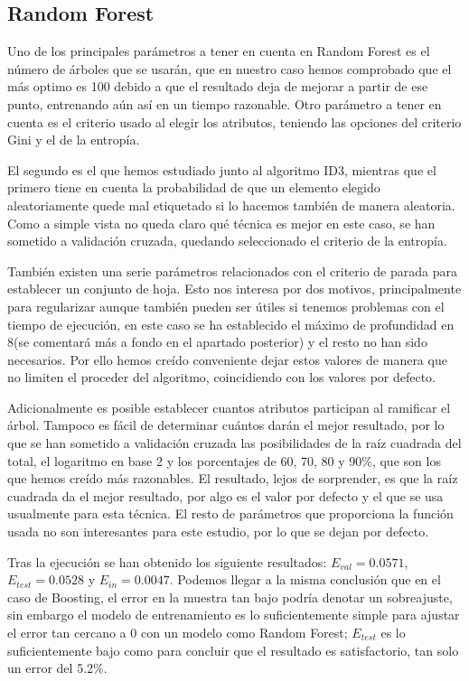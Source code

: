 \documentclass{article}
\begin{document}
	\subsection{Random Forest}
	Uno de los principales parámetros a tener en cuenta en Random Forest es el número de árboles que se usarán, que en nuestro caso hemos comprobado que el más optimo es 100 debido a que el resultado deja de mejorar a partir de ese punto, entrenando aún así en un tiempo razonable. Otro parámetro a tener en cuenta es el criterio usado al elegir los atributos, teniendo las opciones del criterio Gini y el de la entropía.
	\par
	El segundo es el que hemos estudiado junto al algoritmo ID3, mientras que el primero tiene en cuenta la probabilidad de que un elemento elegido aleatoriamente quede mal etiquetado si lo hacemos también de manera aleatoria. Como a simple vista no queda claro qué técnica es mejor en este caso, se han sometido a validación cruzada, quedando seleccionado el criterio de la entropía.
	\par
	También existen una serie parámetros relacionados con el criterio de parada para establecer un conjunto de hoja. Esto nos interesa por dos motivos, principalmente para regularizar aunque también pueden ser útiles si tenemos problemas con el tiempo de ejecución, en este caso se ha establecido el máximo de profundidad en 8(se comentará más a fondo en el apartado posterior) y el resto no han sido necesarios. Por ello hemos creído conveniente dejar estos valores de manera que no limiten el proceder del algoritmo, coincidiendo con los valores por defecto.
	\par
	Adicionalmente es posible establecer cuantos atributos participan al ramificar el árbol. Tampoco es fácil de determinar cuántos darán el mejor resultado, por lo que se han sometido a validación cruzada las posibilidades de la raíz cuadrada del total, el logaritmo en base 2 y los porcentajes de 60, 70, 80 y 90\%, que son los que hemos creído más razonables. El resultado, lejos de sorprender, es que la raíz cuadrada da el mejor resultado, por algo es el valor por defecto y el que se usa usualmente para esta técnica. El resto de parámetros que proporciona la función usada no son interesantes para este estudio, por lo que se dejan por defecto.
	\par
	Tras la ejecución se han obtenido los siguiente resultados: $E_{val} = 0.0571$, $E_{test} = 0.0528$ y $E_{in} = 0.0047$. Podemos llegar a la misma conclusión que en el caso de Boosting, el error en la muestra tan bajo podría denotar un sobreajuste, sin embargo el modelo de entrenamiento es lo suficientemente simple para ajustar el error tan cercano a 0 con un modelo como Random Forest; $E_{test}$ es lo suficientemente bajo como para concluir que el resultado es satisfactorio, tan solo un error del 5.2\%.
	
\end{document}
